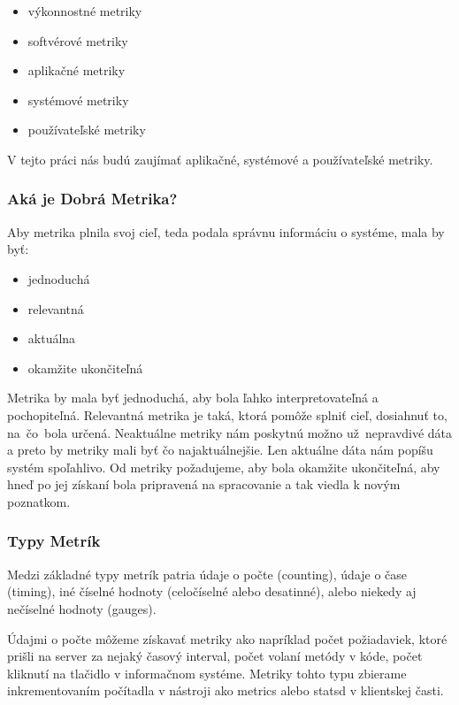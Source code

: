 \documentclass[a4paper, usesections, upjsfrontpage, thesismargins, thesislinespacing]{rnthesis}
\begin{document}
\begin{itemize}
	\item výkonnostné metriky
	\item softvérové metriky
	\item aplikačné metriky
	\item systémové metriky
	\item používateľské metriky
\end{itemize}

V tejto práci nás budú zaujímať aplikačné, systémové a používateľské metriky.

\subsubsection{Aká je Dobrá Metrika?}

Aby metrika plnila svoj cieľ, teda podala správnu informáciu o systéme, mala by byť:
\begin{itemize}
	\item jednoduchá
	\item relevantná
	\item aktuálna
	\item okamžite ukončiteľná
\end{itemize}

Metrika by mala byť jednoduchá, aby bola ľahko interpretovateľná a pochopiteľná.
Relevantná metrika je taká, ktorá pomôže splniť cieľ, dosiahnuť to, na~čo~bola určená.
Neaktuálne metriky nám poskytnú možno už~nep\-ravdivé dáta a preto by metriky mali byť čo najaktuálnejšie. 
Len aktuálne dáta nám popíšu systém spoľahlivo.
Od metriky požadujeme, aby bola okamžite ukončiteľná, aby hneď po jej získaní bola pripravená na spracovanie a tak viedla k novým poznatkom.

\subsubsection{Typy Metrík}

Medzi základné typy metrík patria údaje o počte (counting), údaje o čase (timing), iné číselné hodnoty (celočíselné alebo desatinné), alebo niekedy aj nečíselné hodnoty (gauges). 

Údajmi o počte môžeme získavať metriky ako napríklad počet požiadaviek, ktoré prišli na server za nejaký časový interval, počet volaní metódy v kóde, počet kliknutí na tlačidlo v informačnom systéme. Metriky tohto typu zbierame inkrementovaním počítadla v nástroji ako metrics alebo statsd v klientskej časti.
\end{document}
